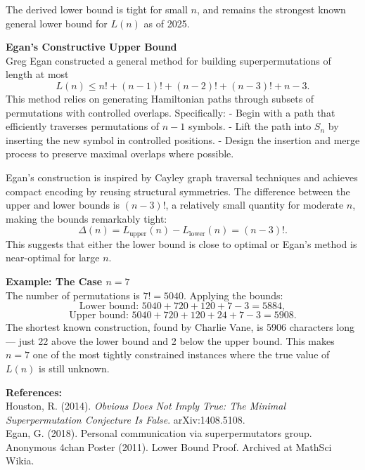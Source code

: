 \begin{technical}
The derived lower bound is tight for small \(n\), and remains the strongest known general lower bound for \(L(n)\) as of 2025.

\noindent\textbf{Egan’s Constructive Upper Bound}\\[0.5em]
Greg Egan constructed a general method for building superpermutations of length at most
\[
L(n) \leq n! + (n-1)! + (n-2)! + (n-3)! + n - 3.
\]
This method relies on generating Hamiltonian paths through subsets of permutations with controlled overlaps. Specifically:
- Begin with a path that efficiently traverses permutations of \(n-1\) symbols.
- Lift the path into \(S_n\) by inserting the new symbol in controlled positions.
- Design the insertion and merge process to preserve maximal overlaps where possible.

Egan's construction is inspired by Cayley graph traversal techniques and achieves compact encoding by reusing structural symmetries. The difference between the upper and lower bounds is \((n-3)!\), a relatively small quantity for moderate \(n\), making the bounds remarkably tight:
\[
\Delta(n) = L_{\text{upper}}(n) - L_{\text{lower}}(n) = (n-3)!.
\]
This suggests that either the lower bound is close to optimal or Egan’s method is near-optimal for large \(n\).

\noindent\textbf{Example: The Case \(n = 7\)}\\[0.5em]
The number of permutations is \(7! = 5040\). Applying the bounds:
\[
\text{Lower bound: } 5040 + 720 + 120 + 7 - 3 = 5884,
\]
\[
\text{Upper bound: } 5040 + 720 + 120 + 24 + 7 - 3 = 5908.
\]
The shortest known construction, found by Charlie Vane, is 5906 characters long — just 22 above the lower bound and 2 below the upper bound. This makes \(n = 7\) one of the most tightly constrained instances where the true value of \(L(n)\) is still unknown.

\vspace{0.5em}
\noindent\textbf{References:}\\
Houston, R. (2014). \textit{Obvious Does Not Imply True: The Minimal Superpermutation Conjecture Is False}. arXiv:1408.5108.\\
Egan, G. (2018). Personal communication via superpermutators group.\\
Anonymous 4chan Poster (2011). Lower Bound Proof. Archived at MathSci Wikia.
\end{technical}
